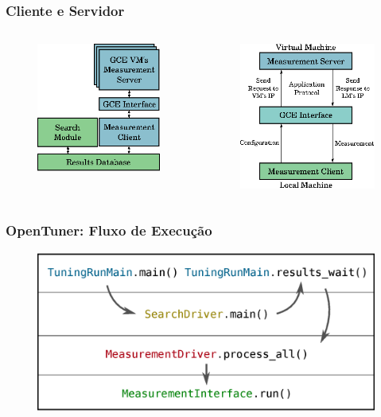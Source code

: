 \documentclass[10pt, compress]{beamer}
\begin{document}
\begin{frame}[fragile]
  \frametitle{Cliente e Servidor}
    \begin{columns}
        \begin{figure}[H]
            \centering
            \includegraphics[scale=.62]{high-level-implementation}
        \end{figure}%
        \begin{figure}[H]
            \centering
            \includegraphics[scale=.62]{low-level-implementation}
        \end{figure}%
    \end{columns}
\end{frame}

\begin{frame}[fragile]
  \frametitle{OpenTuner: Fluxo de Execução}
  \begin{figure}[H]
      \centering
      \includegraphics[width=.8\textwidth]{opentunerflow_simple}
  \end{figure}
\end{frame}
\end{document}
